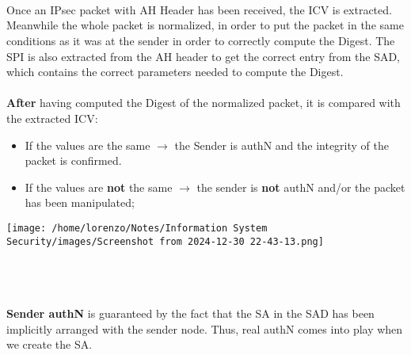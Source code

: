 \\  
\\   
\\
\noindent
\begin{minipage}{0.6\textwidth}
Once an IPsec packet with AH Header has been received, the ICV is extracted. Meanwhile the whole packet is normalized, in order to put the packet in the same conditions as it was at the sender in order to correctly compute the Digest. The SPI is also extracted from the AH header to get the correct entry from the SAD, which contains the correct parameters needed to compute the Digest.\\
\\
\textbf{After} having computed the Digest of the normalized packet, it is compared with the extracted
ICV:
\begin{itemize}
    \item If the values are the same \(\rightarrow \) the Sender is authN and the integrity of the packet is
    confirmed.
    \item If the values are \textbf{not} the same \(\rightarrow \) the sender is \textbf{not} authN and/or the packet has been manipulated;
\end{itemize} 
\end{minipage} 
\hspace{0.3cm}
\begin{minipage}{0.4\textwidth}
    \centering
    \texttt{[image: /home/lorenzo/Notes/Information System Security/images/Screenshot from 2024-12-30 22-43-13.png]}
\end{minipage}
\\    
\\
\\
\noindent
\textbf{Sender authN} is guaranteed by the fact that the SA in the SAD has been implicitly arranged with the sender node. Thus, real authN comes into play when we create the SA.

